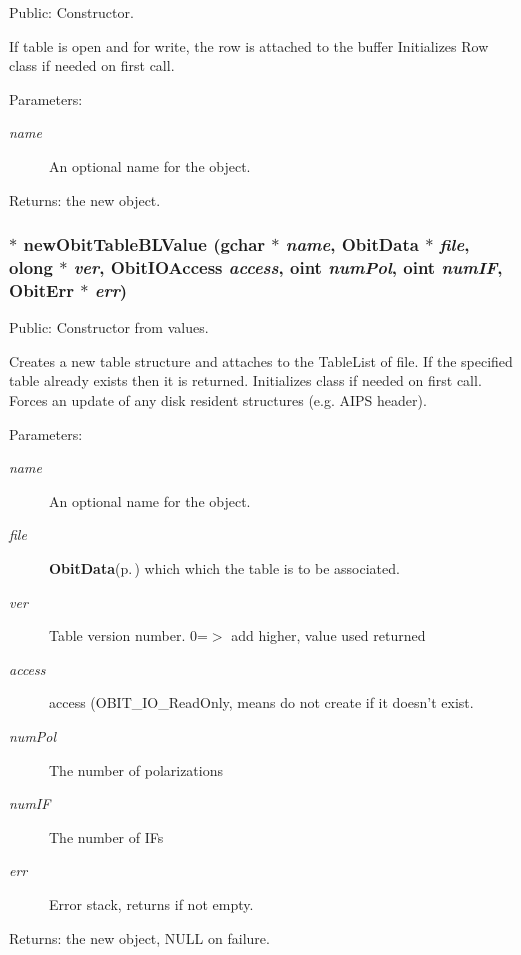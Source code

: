 Public: Constructor. 

If table is open and for write, the row is attached to the buffer Initializes Row class if needed on first call. \begin{Desc}
\item[Parameters:]
\begin{description}
\item[{\em name}]An optional name for the object. \end{description}
\end{Desc}
\begin{Desc}
\item[Returns:]the new object. \end{Desc}
\subsubsection{$\ast$ new\-Obit\-Table\-BLValue (gchar $\ast$ {\em name}, {\bf Obit\-Data} $\ast$ {\em file}, {\bf olong} $\ast$ {\em ver}, Obit\-IOAccess {\em access}, {\bf oint} {\em num\-Pol}, {\bf oint} {\em num\-IF}, {\bf Obit\-Err} $\ast$ {\em err})}\label{ObitTableBL_8h_a12}


Public: Constructor from values. 

Creates a new table structure and attaches to the Table\-List of file. If the specified table already exists then it is returned. Initializes class if needed on first call. Forces an update of any disk resident structures (e.g. AIPS header). \begin{Desc}
\item[Parameters:]
\begin{description}
\item[{\em name}]An optional name for the object. \item[{\em file}]{\bf Obit\-Data}{\rm (p.\,\pageref{structObitData})} which which the table is to be associated. \item[{\em ver}]Table version number. 0=$>$ add higher, value used returned \item[{\em access}]access (OBIT\_\-IO\_\-Read\-Only, means do not create if it doesn't exist. \item[{\em num\-Pol}]The number of polarizations \item[{\em num\-IF}]The number of IFs \item[{\em err}]Error stack, returns if not empty. \end{description}
\end{Desc}
\begin{Desc}
\item[Returns:]the new object, NULL on failure. \end{Desc}
